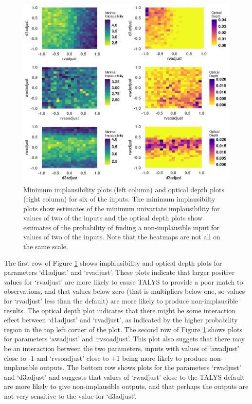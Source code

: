 \documentclass[
  12pt,
  a4paper,
  twoside]{book}
\begin{document}
\begin{figure}[H]

{\centering \includegraphics[width=1\linewidth,height=2\textheight]{figures/impl_plot2} 

}

\caption{Minimum implausibility plots (left column) and optical depth plots (right column) for six of the inputs. The minimum implausibilty plots show estimates of the minimum univariate implausibility for values of two of the inputs and the optical depth plots show estimates of the probability of finding a non-implausible input for values of two of the inputs. Note that the heatmaps are not all on the same scale.}\label{fig:implausibility-plots}
\end{figure}

The first row of Figure \ref{fig:implausibility-plots} shows implausibility and optical depth plots for parameters `d1adjust' and `rvadjust'. These plots indicate that larger positive values for `rvadjust' are more likely to cause TALYS to provide a poor match to observations, and that values below zero (that is multipliers below one, so values for `rvadjust' less than the default) are more likely to produce non-implausible results. The optical depth plot indicates that there might be some interaction effect between `d1adjust' and `rvadjust', as indicated by the higher probability region in the top left corner of the plot. The second row of Figure \ref{fig:implausibility-plots} shows plots for parameters `awadjust' and `rvsoadjust'. This plot also suggets that there may be an interaction between the two parameters, inputs with values of `awadjust' close to -1 and `rvsoadjust' close to +1 being more likely to produce non-implausible outputs. The bottom row shows plots for the parameters `rwadjust' and `d3adjust' and suggests that values of `rwadjust' close to the TALYS default are more likely to give non-implausible outputs, and that perhaps the outputs are not very sensitive to the value for `d3adjust'.
\end{document}
